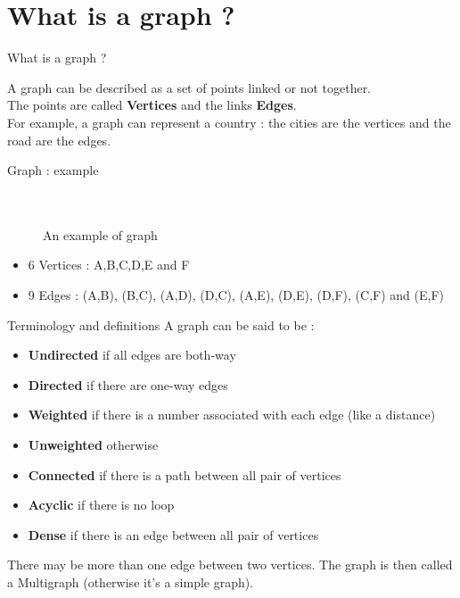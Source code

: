 \documentclass[handout,code={Graphs I},title={Introduction, DFS, BFS}]{../share/cpslide}
\begin{document}
\newcommand{\directedwgraph}[2]{\wgraph{#1}{->}}
\newcommand{\undirectedwgraph}[2]{\wgraph{#1}{-}}

\section{What is a graph ?}

\begin{frame}{What is a graph ?}

A graph can be described as a set of points linked or not together. \\

The points are called \textbf{Vertices} and the links \textbf{Edges}. \\  

For example, a graph can represent a country : the cities are the vertices and the road are the edges. 


\end{frame}

\begin{frame}{Graph : example}
\begin{figure}
\center
{}
\\
\\
An example of graph
\end{figure}

\begin{itemize}
\item 6 Vertices : A,B,C,D,E and F 
\item 9 Edges : (A,B), (B,C), (A,D), (D,C), (A,E), (D,E), (D,F), (C,F) and (E,F)
\end{itemize}
\end{frame}



\begin{frame}{Terminology and definitions}
A graph can be said to be :
\begin{itemize}
\item \textbf{Undirected} if all edges are both-way
\item \textbf{Directed} if there are one-way edges
\item \textbf{Weighted} if there is a number associated with each edge (like a distance)
\item \textbf{Unweighted} otherwise
\item \textbf{Connected} if there is a path between all pair of vertices
\item \textbf{Acyclic} if there is no loop
\item \textbf{Dense} if there is an edge between all pair of vertices
\end{itemize}

\begin{warning}
There may be more than one edge between two vertices. The graph is then called a Multigraph (otherwise it's a simple graph). 
\end{warning}

\end{frame}
\end{document}
